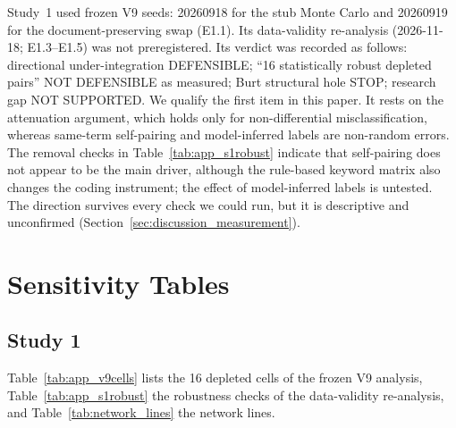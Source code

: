Study~1 used frozen V9 seeds: 20260918 for the stub Monte Carlo and 20260919 for the document-preserving swap (E1.1). Its data-validity re-analysis (2026-11-18; E1.3--E1.5) was not preregistered. Its verdict was recorded as follows: directional under-integration DEFENSIBLE; ``16 statistically robust depleted pairs'' NOT DEFENSIBLE as measured; Burt structural hole STOP; research gap NOT SUPPORTED. We qualify the first item in this paper. It rests on the attenuation argument, which holds only for non-differential misclassification, whereas same-term self-pairing and model-inferred labels are non-random errors. The removal checks in Table~\ref{tab:app_s1robust} indicate that self-pairing does not appear to be the main driver, although the rule-based keyword matrix also changes the coding instrument; the effect of model-inferred labels is untested. The direction survives every check we could run, but it is descriptive and unconfirmed (Section~\ref{sec:discussion_measurement}).

\section{Sensitivity Tables}
\label{app:sens}

\subsection{Study 1}

Table~\ref{tab:app_v9cells} lists the 16 depleted cells of the frozen V9 analysis, Table~\ref{tab:app_s1robust} the robustness checks of the data-validity re-analysis, and Table~\ref{tab:network_lines} the network lines.

